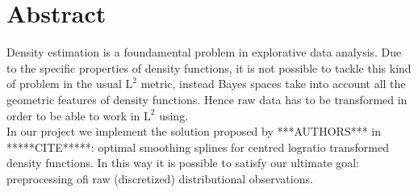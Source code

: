 \newpage
\chapter*{Abstract}


Density estimation is a foundamental problem in explorative data analysis.
Due to the specific properties of density functions, it is not possible to tackle this kind of problem in the usual $\text{L}^2$ metric, instead Bayes spaces take into account all the geometric features of density functions. Hence raw data has to be transformed in order to be able to work in $\text{L}^2$ using.\\
In our project we implement the solution proposed by ***AUTHORS***  in *****CITE*****:  optimal smoothing splines for  centred logratio transformed density functions. In this way it is possible to satisfy our ultimate goal: preprocessing ofi raw (discretized) distributional observations. 


